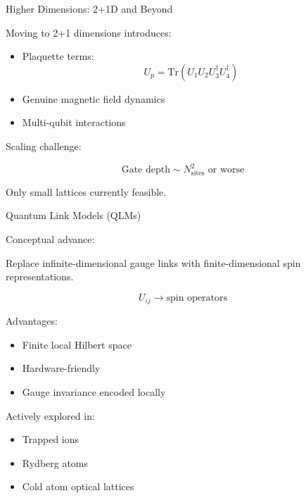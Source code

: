 \documentclass[11pt]{beamer}
\begin{document}
\begin{frame}{Higher Dimensions: 2+1D and Beyond}

Moving to 2+1 dimensions introduces:

\begin{itemize}
\item Plaquette terms:
\[
U_p = \mathrm{Tr}(U_1 U_2 U_3^\dagger U_4^\dagger)
\]
\item Genuine magnetic field dynamics
\item Multi-qubit interactions
\end{itemize}

Scaling challenge:

\[
\text{Gate depth} \sim N_{\text{sites}}^2 \text{ or worse}
\]

Only small lattices currently feasible.
\end{frame}

\begin{frame}{Quantum Link Models (QLMs)}

Conceptual advance:

Replace infinite-dimensional gauge links with
finite-dimensional spin representations.

\[
U_{ij} \rightarrow \text{spin operators}
\]

Advantages:

\begin{itemize}
\item Finite local Hilbert space
\item Hardware-friendly
\item Gauge invariance encoded locally
\end{itemize}

Actively explored in:

\begin{itemize}
\item Trapped ions
\item Rydberg atoms
\item Cold atom optical lattices
\end{itemize}
\end{frame}
\end{document}

